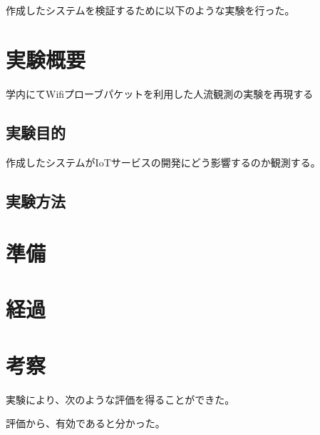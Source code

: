 作成したシステムを検証するために以下のような実験を行った。
\section{実験概要}
	学内にてWifiプローブパケットを利用した人流観測の実験を再現する
\subsection{実験目的}
	作成したシステムがIoTサービスの開発にどう影響するのか観測する。
\subsection{実験方法}
\section{準備}
\section{経過}
\section{考察}


実験により、次のような評価を得ることができた。

評価から、有効であると分かった。

